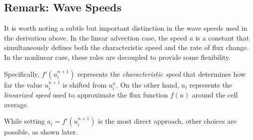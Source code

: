 \subsection*{Remark: Wave Speeds}%
\label{sub:wave_speeds}

It is worth noting a subtle but important distinction in the wave speeds used in the derivation above.
In the linear advection case, the speed \(a\) is a constant that simultaneously defines both the characteristic speed and the rate of flux change.
In the nonlinear case, these roles are decoupled to provide some flexibility.

Specifically, \(f'(u_{i}^{n+1})\) represents the \textit{characteristic speed} that determines how far the value \(u_{i}^{n+1}\) is shifted from \(u_{i}^{n}\).
On the other hand, \(a_i\) represents the \textit{linearized speed} used to approximate the flux function \(f(u)\) around the cell average.

While setting \(a_i = f'(u_{i}^{n+1})\) is the most direct approach, other choices are possible, as shown later.
